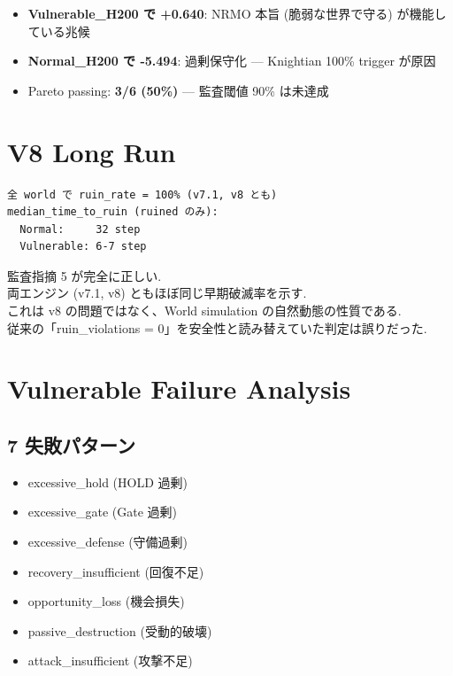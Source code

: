 \documentclass[a4paper,11pt]{report}
\begin{document}
\begin{itemize}[leftmargin=*]
  \item \textcolor{success}{\textbf{Vulnerable\_H200 で +0.640}}: NRMO 本旨 (脆弱な世界で守る) が機能している兆候
  \item \textcolor{warning}{\textbf{Normal\_H200 で -5.494}}: 過剰保守化 — Knightian 100\% trigger が原因
  \item Pareto passing: \textbf{3/6 (50\%)} — 監査閾値 90\% は未達成
\end{itemize}

\section{V8 Long Run}

\begin{lstlisting}
全 world で ruin_rate = 100% (v7.1, v8 とも)
median_time_to_ruin (ruined のみ):
  Normal:     32 step
  Vulnerable: 6-7 step
\end{lstlisting}

\begin{honest}
監査指摘 5 が完全に正しい. \\
両エンジン (v7.1, v8) ともほぼ同じ早期破滅率を示す. \\
これは v8 の問題ではなく、World simulation の自然動態の性質である. \\
従来の「ruin\_violations = 0」を安全性と読み替えていた判定は誤りだった.
\end{honest}

\section{Vulnerable Failure Analysis}

\subsection{7 失敗パターン}

\begin{itemize}[leftmargin=*]
  \item excessive\_hold (HOLD 過剰)
  \item excessive\_gate (Gate 過剰)
  \item excessive\_defense (守備過剰)
  \item recovery\_insufficient (回復不足)
  \item opportunity\_loss (機会損失)
  \item passive\_destruction (受動的破壊)
  \item attack\_insufficient (攻撃不足)
\end{itemize}
\end{document}
